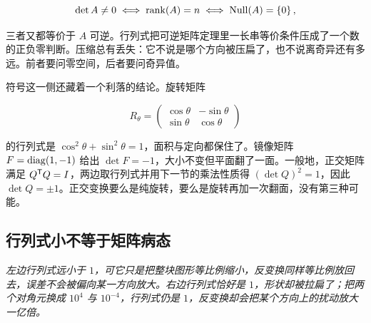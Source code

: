 \[
\det A\neq0
\;\Longleftrightarrow\;
\operatorname{rank}(A)=n
\;\Longleftrightarrow\;
\operatorname{Null}(A)=\left\{0\right\},
\]

三者又都等价于 \(A\) 可逆。行列式把可逆矩阵定理里一长串等价条件压成了一个数的正负零判断。压缩总有丢失：它不说是哪个方向被压扁了，也不说离奇异还有多远。前者要问零空间，后者要问奇异值。

符号这一侧还藏着一个利落的结论。旋转矩阵

\[
R_\theta=\begin{pmatrix}\cos\theta&-\sin\theta\\ \sin\theta&\cos\theta\end{pmatrix}
\]

的行列式是 \(\cos^2\theta+\sin^2\theta=1\)，面积与定向都保住了。镜像矩阵 \(F=\operatorname{diag}(1,-1)\) 给出 \(\det F=-1\)，大小不变但平面翻了一面。一般地，正交矩阵满足 \(Q^{\mathsf{T}}Q=I\)，两边取行列式并用下一节的乘法性质得 \((\det Q)^2=1\)，因此 \(\det Q=\pm1\)。正交变换要么是纯旋转，要么是旋转再加一次翻面，没有第三种可能。

\subsection{行列式小不等于矩阵病态}

\begin{center}

\emph{左边行列式远小于 \(1\)，可它只是把整块图形等比例缩小，反变换同样等比例放回去，误差不会被偏向某一方向放大。右边行列式恰好是 \(1\)，形状却被拉扁了；把两个对角元换成 \(10^{4}\) 与 \(10^{-4}\)，行列式仍是 \(1\)，反变换却会把某个方向上的扰动放大一亿倍。}
\end{center}

